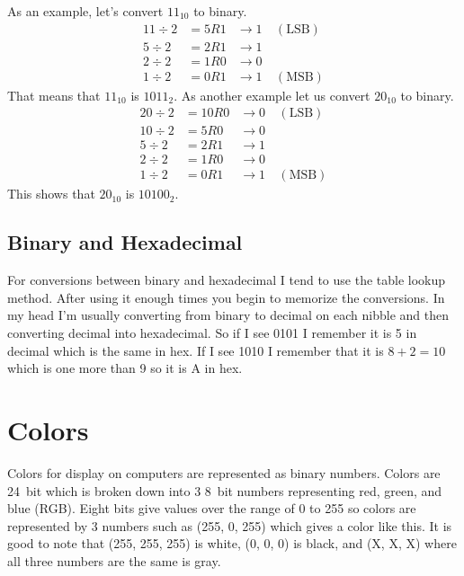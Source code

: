 As an example, let's convert $11_{10}$ to binary. 
\begin{equation}
	\begin{aligned}
		11 \div 2 & = 5R1 &\rightarrow 1 &\mathrm{~(LSB)} \\
		5 \div 2 & = 2R1 &\rightarrow 1 \\
		2 \div 2 & = 1R0 &\rightarrow 0 \\
		1 \div 2 & = 0R1 &\rightarrow 1 & \mathrm{~(MSB)}
	\end{aligned}
\end{equation}
That means that $11_{10}$ is $1011_2$. As another example let us convert $20_{10}$ to binary.
\begin{equation}
	\begin{aligned}
		20 \div 2 & = 10R0 &\rightarrow 0 &\mathrm{~(LSB)}\\
		10 \div 2 & = 5R0  &\rightarrow 0 \\
		5 \div 2 &  = 2R1  &\rightarrow 1 \\
		2 \div 2 &  = 1R0  &\rightarrow 0 \\
		1 \div 2 &  = 0R1  &\rightarrow 1 & \mathrm{~(MSB)}
	\end{aligned}
\end{equation}
This shows that $20_{10}$ is $10100_2$.

\subsection{Binary and Hexadecimal}
For conversions between binary and hexadecimal I tend to use the table lookup method. After using it 
enough times you begin to memorize the conversions. In my head I'm usually converting from binary to 
decimal on each nibble and then converting decimal into hexadecimal. So if I see 0101 I remember it 
is 5 in decimal which is the same in hex. If I see 1010 I remember that it is $8 + 2 = 10$ which is 
one more than 9 so it is A in hex.

\section{Colors}
Colors for display on computers are represented as binary numbers. Colors are 24~bit which is broken
down into 3 8~bit numbers representing red, green, and blue (RGB). Eight bits give values over the 
range of 0 to 255 so colors are represented by 3 numbers such as (255, 0, 255) which gives a 
\textcolor[RGB]{255, 0, 255}{color like this}. It is good to note that (255, 255, 255) is white,
(0, 0, 0) is black, and (X, X, X) where all three numbers are the same is gray.

